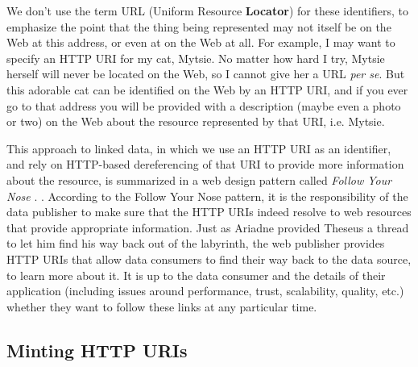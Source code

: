 We don't use the term URL (Uniform Resource \textbf{Locator}) for these identifiers, to emphasize the 
point that the thing  being
represented may not itself be on the Web at this address, or even at on the Web at all. For example, I
may want to specify an HTTP URI for my cat, Mytsie. No matter how hard I
try, Mytsie herself will never be located on the Web, so I cannot give
her a URL \emph{per se}. But this adorable cat can be identified on the
Web by an HTTP URI, and if you ever go to that address you will be
provided with a description (maybe even a photo or two) on the Web about the resource represented by
that URI, i.e.  Mytsie.

This approach to linked data, in which we use an HTTP URI as an identifier, and 
rely on HTTP-based dereferencing of that URI to provide more information about the resource, 
is summarized in a web design pattern called \emph{Follow Your Nose} \cite{dodds2012linked}. .
According to the  Follow Your Nose pattern,  it is the responsibility of the data publisher
to make sure that the HTTP URIs indeed resolve to web resources that provide
appropriate information. Just as Ariadne provided Theseus a thread to let him
find his way back out of the labyrinth, the web publisher provides HTTP URIs
that allow data consumers to find their way back to the data source, to
learn more about it.  It is up to the data consumer and the details of their application (including issues around performance, trust, scalability,
quality, etc.)
whether they want to follow these links at any particular time. 






\hypertarget{minting-http-uris}{%
\subsection{Minting HTTP URIs}\label{minting-http-uris}}

